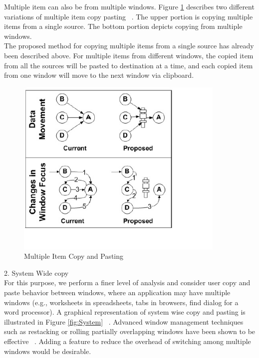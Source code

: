 \documentclass{acm_proc_article-sp}
\begin{document}
 Multiple item can also be from multiple windows. Figure \ref{fig:Multi} describes two different variations of multiple item copy pasting ~\cite{cpHabits}. The upper portion is copying multiple items from a single source. The bottom portion depicts copying from multiple windows.\\
 
 The proposed method for copying multiple items from a single source has already been described above. For multiple items from different windows, the copied item from all the sources will be pasted to destination at a time, and each copied item from one window  will move to the next window via clipboard.\\
 \begin{figure}[h]
 \centering
\includegraphics[width=10cm]{MultiItem}
\caption{Multiple Item Copy and Pasting}
    \label{fig:Multi}
\end{figure}
2. System Wide copy\\
For this purpose, we perform a finer level of analysis and consider user copy and paste behavior between windows, where an application may have multiple windows (e.g., worksheets in spreadsheets, tabs in browsers,  find dialog for a word processor). A graphical representation of system wise copy and pasting is illustrated in Figure \ref{fig:System} ~\cite{cpHabits}. Advanced window management techniques such as restacking or rolling partially overlapping windows have been shown to be effective ~\cite{overlapWindow}. Adding a feature to reduce the overhead of switching among multiple windows would be desirable.
\end{document}
